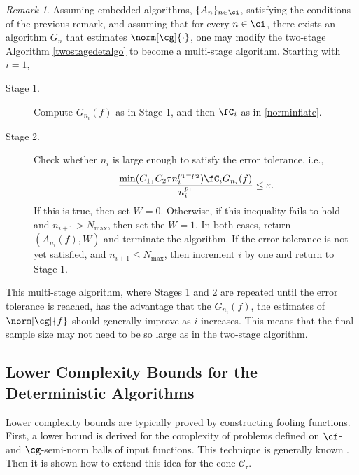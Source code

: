 \documentclass[final]{elsarticle}
\newcommand{\cc}{\mathcal{C}}
\theoremstyle{definition}
\theoremstyle{remark}
\newtheorem{rem}{Remark}
\begin{document}
\begin{rem} Assuming embedded algorithms, $\{A_n\}_{n \in \ci}$, satisfying the conditions of the previous remark, and assuming that for every $n \in \ci$, there exists an algorithm $G_n$ that estimates $\norm[\cg]{\cdot}$, one may modify the two-stage Algorithm \ref{twostagedetalgo} to become a multi-stage algorithm.  Starting with $i=1$, 

\begin{description}

\item [Stage 1.] Compute $G_{n_i}(f)$ as in Stage 1, and then $\fC_{i}$ as in \eqref{norminflate}.  

\item [Stage 2.] Check whether $n_i$ is large enough to satisfy the error tolerance, i.e., 
\[
\frac{\min(C_1,C_2\tau n_i^{p_1-p_2})\fC_i G_{n_i}(f)}{n_i^{p_1}} \le \varepsilon.
\]
If this is true, then set $W=0$.  Otherwise, if this inequality fails to hold and $n_{i+1} > N_{\max}$, then set the $W=1$.  In both cases, return $(A_{n_i}(f),W)$ and terminate the algorithm.  If the error tolerance is not yet satisfied, and $n_{i+1} \le N_{\max}$, then increment $i$ by one and return to Stage 1.
\end{description}

This multi-stage algorithm, where Stages 1 and 2 are repeated until the error tolerance is reached, has the advantage that the $ G_{n_i}(f)$, the estimates of $\norm[\cg]{f}$ should generally improve as $i$ increases.  This means that the final sample size may not need to be so large as in the two-stage algorithm.
\end{rem}

\subsection{Lower Complexity Bounds for the Deterministic Algorithms}
Lower complexity bounds are typically proved by constructing fooling functions.  First, a lower bound is derived for the complexity of problems defined on $\cf$- and $\cg$-semi-norm balls of input functions.  This technique is generally known \cite{???}.  Then it is shown how to extend this idea for the cone $\cc_{\tau}$.  
\end{document}
